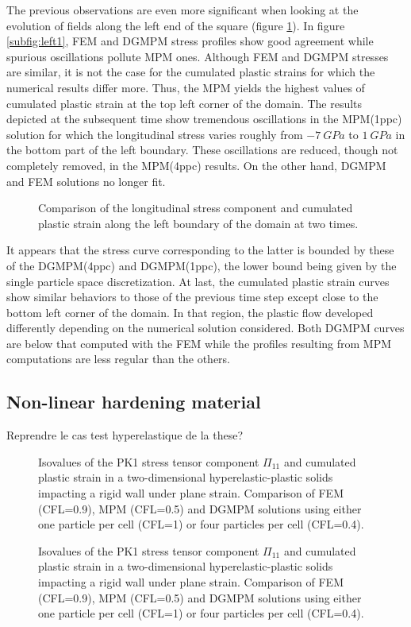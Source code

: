 The previous observations are even more significant when looking at the evolution of fields along the left end of the square (figure \ref{fig:left_line}).
In figure \ref{subfig:left1}, FEM and DGMPM stress profiles show good agreement while spurious oscillations pollute MPM ones. 
Although FEM and DGMPM stresses are similar, it is not the case for the cumulated plastic strains for which the numerical results differ more.
Thus, the MPM yields the highest values of cumulated plastic strain at the top left corner of the domain.
The results depicted at the subsequent time show tremendous oscillations in the MPM(1ppc) solution for which the longitudinal stress varies roughly from $-7 \: GPa$ to $1 \: GPa$ in the bottom part of the left boundary.
These oscillations are reduced, though not completely removed, in the MPM(4ppc) results. 
On the other hand, DGMPM and FEM solutions no longer fit.
\begin{figure}[ht]
  \centering
  {}
  {}
  
  \caption{Comparison of the longitudinal stress component and cumulated plastic strain along the left boundary of the domain at two times.}
  \label{fig:left_line}
\end{figure}
It appears that the stress curve corresponding to the latter is bounded by these of the DGMPM(4ppc) and DGMPM(1ppc), the lower bound being given by the single particle space discretization.
At last, the cumulated plastic strain curves show similar behaviors to those of the previous time step except close to the bottom left corner of the domain.
In that region, the plastic flow developed differently depending on the numerical solution considered.
Both DGMPM curves are below that computed with the FEM while the profiles resulting from MPM computations are less regular than the others.

\subsection{Non-linear hardening material}
\label{sec:non-linear-hardening}
Reprendre le cas test hyperelastique de la these?

\begin{figure}[ht]
  \centering
  
  \caption{Isovalues of the PK1 stress tensor component $\Pi_{11}$ and cumulated plastic strain in a two-dimensional hyperelastic-plastic solids impacting a rigid wall under plane strain. Comparison of FEM (CFL=0.9), MPM (CFL=0.5) and DGMPM solutions using either one particle per cell (CFL=1) or four particles per cell (CFL=0.4).}
  \label{fig:PS_taylor}
\end{figure}
\begin{figure}[ht]
  \centering
  
  \caption{Isovalues of the PK1 stress tensor component $\Pi_{11}$ and cumulated plastic strain in a two-dimensional hyperelastic-plastic solids impacting a rigid wall under plane strain. Comparison of FEM (CFL=0.9), MPM (CFL=0.5) and DGMPM solutions using either one particle per cell (CFL=1) or four particles per cell (CFL=0.4).}
  \label{fig:PS_taylor}
\end{figure}

